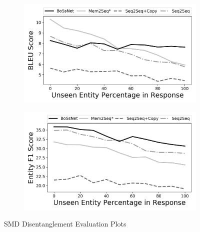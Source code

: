 \begin{figure}[!t]
\centering
\begin{subfigure}{0.8\textwidth}
 \includegraphics[width=\linewidth]{assets/graphs/smd_BLEU.png}
 \caption{}\label{fig:smdBleu}
\end{subfigure}

\vspace*{0.5in}

\begin{subfigure}{0.8\textwidth}
 \includegraphics[width=\linewidth]{assets/graphs/smd_F1.png}
 \caption{}\label{fig:smdF1}
\end{subfigure}

\caption{SMD Disentanglement Evaluation Plots}
\end{figure}

\clearpage


